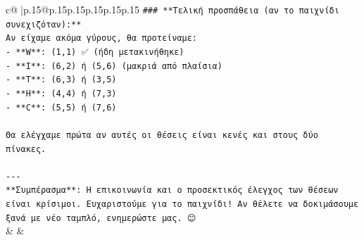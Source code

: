\documentclass{article}
\begin{document}
{\begin{supertabular}{c@{$\;$}|p{.15\linewidth}@{}p{.15\linewidth}p{.15\linewidth}p{.15\linewidth}p{.15\linewidth}p{.15\linewidth}}
{{{\texttt{\#\#\# **Τελική προσπάθεια (αν το παιχνίδι συνεχιζόταν):**} \\
\texttt{Αν είχαμε ακόμα γύρους, θα προτείναμε:} \\
\texttt{{-} **W**: (1,1) ✅ (ήδη μετακινήθηκε)} \\
\texttt{{-} **I**: (6,2) ή (5,6) (μακριά από πλαίσια)} \\
\texttt{{-} **T**: (6,3) ή (3,5)} \\
\texttt{{-} **H**: (4,4) ή (7,3)} \\
\texttt{{-} **C**: (5,5) ή (7,6)} \\
\\ 
\texttt{Θα ελέγχαμε πρώτα αν αυτές οι θέσεις είναι κενές και στους δύο πίνακες.} \\
\\ 
\texttt{{-}{-}{-}} \\
\texttt{**Συμπέρασμα**: Η επικοινωνία και ο προσεκτικός έλεγχος των θέσεων είναι κρίσιμοι. Ευχαριστούμε για το παιχνίδι! Αν θέλετε να δοκιμάσουμε ξανά με νέο ταμπλό, ενημερώστε μας. 😊} \\
            }
        }
    }
    & & \\ \\


\end{supertabular}}
\end{document}

